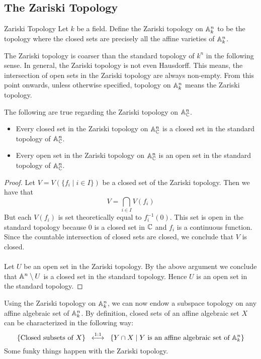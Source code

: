 \documentclass[a4paper]{article}
\begin{document}
\subsection{The Zariski Topology}
\begin{defn}{Zariski Topology}{} Let $k$ be a field. Define the Zariski topology on $\mathbb{A}_k^n$ to be the topology where the closed sets are precisely all the affine varieties of $\mathbb{A}_k^n$. 
\end{defn}

The Zariski topology is coarser than the standard topology of $k^n$ in the following sense. In general, the Zariski topology is not even Hausdorff. This means, the intersection of open sets in the Zariski topology are always non-empty. From this point onwards, unless otherwise specified, topology on $\mathbb{A}_k^n$ means the Zariski topology. 

\begin{lmm}{}{} The following are true regarding the Zariski topology on $\mathbb{A}_{\mathbb{C}}^n$. 
\begin{itemize}
\item Every closed set in the Zariski topology on $\mathbb{A}_{\mathbb{C}}^n$ is a closed set in the standard topology of $\mathbb{A}_{\mathbb{C}}^n$. 
\item Every open set in the Zariski topology on $\mathbb{A}_{\mathbb{C}}^n$ is an open set in the standard topology of $\mathbb{A}_{\mathbb{C}}^n$. 
\end{itemize} \tcbline
\begin{proof}
Let $V=V(\{f_i\;|\;i\in I\})$ be a closed set of the Zariski topology. Then we have that $$V=\bigcap_{i\in I}V(f_i)$$ But each $V(f_i)$ is set theoretically equal to $f_i^{-1}(0)$. This set is open in the standard topology because $0$ is a closed set in $\mathbb{C}$ and $f_i$ is a continuous function. Since the countable intersection of closed sets are closed, we conclude that $V$ is closed. \\~\\

Let $U$ be an open set in the Zariski topology. By the above argument we conclude that $\mathbb{A}^n\setminus U$ is a closed set in the standard topology. Hence $U$ is an open set in the standard topology. 
\end{proof}
\end{lmm}

Using the Zariski topology on $\mathbb{A}_k^n$, we can now endow a subspace topology on any affine algebraic set of $\mathbb{A}_k^n$. By definition, closed sets of an affine algebraic set $X$ can be characterized in the following way: $$\left\{\text{Closed subsets of }X\right\}\;\;\overset{1:1}{\longleftrightarrow}\;\;\left\{Y\cap X\;|\; Y\text{ is an affine algebraic set of }\mathbb{A}_k^n\right\}$$ Some funky things happen with the Zariski topology. 
\end{document}
